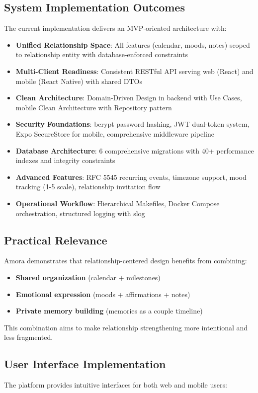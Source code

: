 \documentclass[sigconf, authorversion, nonacm, margin=0.75in]{acmart}
\begin{document}
\subsection{System Implementation Outcomes}
The current implementation delivers an MVP-oriented architecture with:
\begin{itemize}
    \item \textbf{Unified Relationship Space}: All features (calendar, moods, notes) scoped to relationship entity with database-enforced constraints
    \item \textbf{Multi-Client Readiness}: Consistent RESTful API serving web (React) and mobile (React Native) with shared DTOs
    \item \textbf{Clean Architecture}: Domain-Driven Design in backend with Use Cases, mobile Clean Architecture with Repository pattern
    \item \textbf{Security Foundations}: bcrypt password hashing, JWT dual-token system, Expo SecureStore for mobile, comprehensive middleware pipeline
    \item \textbf{Database Architecture}: 6 comprehensive migrations with 40+ performance indexes and integrity constraints
    \item \textbf{Advanced Features}: RFC 5545 recurring events, timezone support, mood tracking (1-5 scale), relationship invitation flow
    \item \textbf{Operational Workflow}: Hierarchical Makefiles, Docker Compose orchestration, structured logging with slog
\end{itemize}

\subsection{Practical Relevance}
Amora demonstrates that relationship-centered design benefits from combining:
\begin{itemize}
    \item \textbf{Shared organization} (calendar + milestones)
    \item \textbf{Emotional expression} (moods + affirmations + notes)
    \item \textbf{Private memory building} (memories as a couple timeline)
\end{itemize}
This combination aims to make relationship strengthening more intentional and less fragmented.

\subsection{User Interface Implementation}
The platform provides intuitive interfaces for both web and mobile users:
\end{document}
